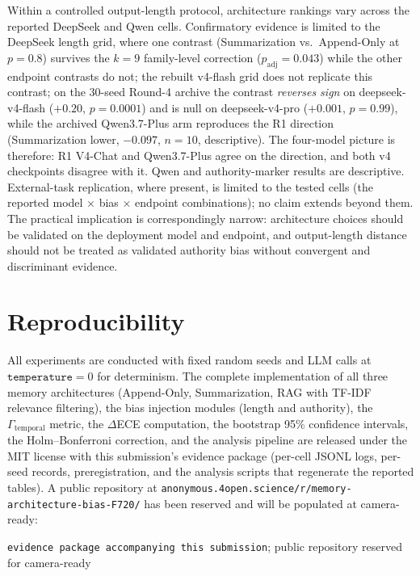 \documentclass[11pt]{article}
\begin{document}
Within a controlled output-length protocol, architecture rankings vary across the reported DeepSeek and Qwen cells. Confirmatory evidence is limited to the DeepSeek length grid, where one contrast (Summarization vs.\ Append-Only at $p{=}0.8$) survives the $k{=}9$ family-level correction ($p_{\text{adj}}{=}0.043$) while the other endpoint contrasts do not; the rebuilt v4-flash grid does not replicate this contrast; on the 30-seed Round-4 archive the contrast \emph{reverses sign} on deepseek-v4-flash ($+0.20$, $p{=}0.0001$) and is null on deepseek-v4-pro ($+0.001$, $p{=}0.99$), while the archived Qwen3.7-Plus arm reproduces the R1 direction (Summarization lower, $-0.097$, $n{=}10$, descriptive). The four-model picture is therefore: R1 V4-Chat and Qwen3.7-Plus agree on the direction, and both v4 checkpoints disagree with it. Qwen and authority-marker results are descriptive. External-task replication, where present, is limited to the tested cells (the reported model $\times$ bias $\times$ endpoint combinations); no claim extends beyond them. The practical implication is correspondingly narrow: architecture choices should be validated on the deployment model and endpoint, and output-length distance should not be treated as validated authority bias without convergent and discriminant evidence.


\section*{Reproducibility}
\label{sec:reproducibility}

All experiments are conducted with fixed random seeds and LLM calls at $\texttt{temperature}=0$ for determinism. The complete implementation of all three memory architectures (Append-Only, Summarization, RAG with TF-IDF relevance filtering), the bias injection modules (length and authority), the $\Gamma_\text{temporal}$ metric, the $\Delta$ECE computation, the bootstrap 95\% confidence intervals, the Holm--Bonferroni correction, and the analysis pipeline are released under the MIT license with this submission's evidence package (per-cell JSONL logs, per-seed records, preregistration, and the analysis scripts that regenerate the reported tables). A public repository at \texttt{anonymous.4open.science/r/memory-architecture-bias-F720/} has been reserved and will be populated at camera-ready:

\begin{center}
\texttt{evidence package accompanying this submission};
public repository reserved for camera-ready
\end{center}
\end{document}
